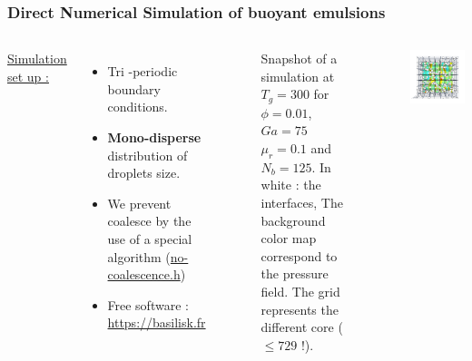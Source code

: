 \documentclass{sintefbeamer}
\begin{document}
\begin{frame}
\frametitle{Direct Numerical Simulation of buoyant emulsions}
\begin{columns}
\underline{Simulation set up :} 
\begin{itemize}
  \item Tri -periodic boundary conditions. 
  \item \textbf{Mono-disperse} distribution of droplets size.
  \item We prevent coalesce by the use of a special algorithm 
  (\href{http://basilisk.fr/sandbox/fintzin/Rising-Suspension/no-coalescence.h}{no-coalescence.h})
  \item Free software : \url{https://basilisk.fr}
\end{itemize}

\begin{figure}
  \caption{Snapshot of a simulation at $T_g = 300$ for $\phi = 0.01$, $Ga = 75$ $\mu_r = 0.1$ and $N_b = 125$. In white : the interfaces, The background color map correspond to the pressure field. The grid represents the different core ($\le 729$ !).
  }
\end{figure}
\centering
\includegraphics[width =  1.1\textwidth]{image/PHI_01_Ga_75.png}
\end{columns}
\end{frame}
\end{document}
